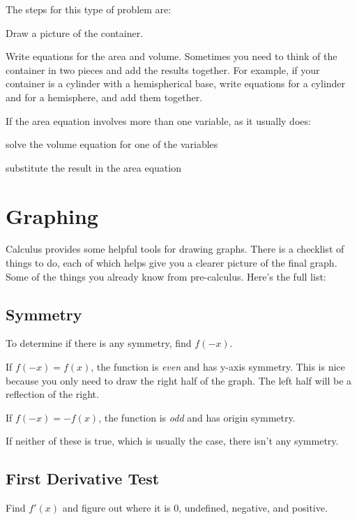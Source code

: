 \documentclass[fleqn]{exam}
\begin{document}
The steps for this type of problem are:
\begin{itemize*}
\item Draw a picture of the container.
\item Write equations for the area and volume.  Sometimes you need to think of the container in two pieces and add the
  results together.  For example, if your container is a cylinder with a hemispherical base, write equations for a
  cylinder and for a hemisphere, and add them together.
\item If the area equation involves more than one variable, as it usually does:
  \begin{itemize*} 
    \item solve the volume equation for one of the variables
    \item substitute the result in the area equation
  \end{itemize*} 
\end{itemize*}

\section{Graphing}

Calculus provides some helpful tools for drawing graphs.  There is a checklist of things to do, each of which helps give
you a clearer picture of the final graph.  Some of the things you already know from pre-calculus.  Here's the full list:

\subsection{Symmetry}

To determine if there is any symmetry, find $f(-x)$.  

If $f(-x) = f(x)$, the function is {\em even} and has y-axis symmetry.  This is nice because you only need to draw the right
half of the graph.  The left half will be a reflection of the right.

If $f(-x) = -f(x)$, the function is {\em odd} and has origin symmetry.

If neither of these is true, which is usually the case, there isn't any symmetry.

\subsection{First Derivative Test}
\label{first-derivative-test}

Find $f'(x)$ and figure out where it is 0, undefined, negative, and positive.  
\end{document}
